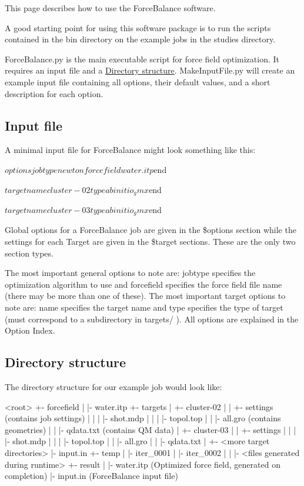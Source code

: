 This page describes how to use the Force\-Balance software.

A good starting point for using this software package is to run the scripts contained in the {\ttfamily bin} directory on the example jobs in the {\ttfamily studies} directory.

{\ttfamily Force\-Balance.\-py} is the main executable script for force field optimization. It requires an input file and a \hyperlink{usage_directory_structure}{Directory structure}. {\ttfamily Make\-Input\-File.\-py} will create an example input file containing all options, their default values, and a short description for each option.\hypertarget{usage_input_file}{}\subsection{Input file}\label{usage_input_file}
A minimal input file for Force\-Balance might look something like this\-:

\begin{DoxyVerb}$options
jobtype newton
forcefield water.itp
$end

$target
name cluster-02
type abinitio_gmx
$end

$target
name cluster-03
type abinitio_gmx
$end\end{DoxyVerb}


Global options for a Force\-Balance job are given in the {\ttfamily \$options} section while the settings for each Target are given in the {\ttfamily \$target} sections. These are the only two section types.

The most important general options to note are\-: {\ttfamily jobtype} specifies the optimization algorithm to use and {\ttfamily forcefield} specifies the force field file name (there may be more than one of these). The most important target options to note are\-: {\ttfamily name} specifies the target name and {\ttfamily type} specifies the type of target (must correspond to a subdirectory in {\ttfamily targets/} ). All options are explained in the Option Index.\hypertarget{usage_directory_structure}{}\subsection{Directory structure}\label{usage_directory_structure}
The directory structure for our example job would look like\-:

\begin{DoxyVerb}<root>
  +- forcefield
  |   |- water.itp
  +- targets
  |   +- cluster-02
  |   |   +- settings (contains job settings)
  |   |   |   |- shot.mdp
  |   |   |   |- topol.top
  |   |   |- all.gro (contains geometries)
  |   |   |- qdata.txt (contains QM data)
  |   +- cluster-03
  |   |   +- settings
  |   |   |   |- shot.mdp
  |   |   |   |- topol.top
  |   |   |- all.gro
  |   |   |- qdata.txt
  |   +- <more target directories>
  |- input.in
  +- temp
  |   |- iter_0001
  |   |- iter_0002
  |   |   |- <files generated during runtime>
  +- result
  |   |- water.itp (Optimized force field, generated on completion)
  |- input.in (ForceBalance input file)
\end{DoxyVerb}


